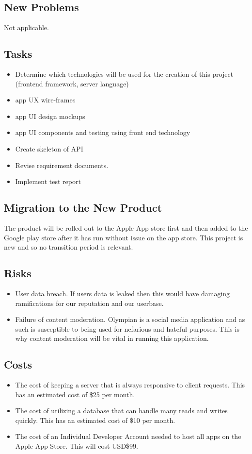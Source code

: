 \documentclass[12pt]{article}
\begin{document}
		\subsection{New Problems}
			Not applicable.
		\subsection{Tasks}
			\begin{itemize}
			\item Determine which technologies will be used for the creation of this project (frontend framework, server language)
			\item  app UX wire-frames
			\item  app UI design mockups
			\item  app UI components and testing using front end technology
			\item  Create skeleton of API
			\item  Revise requirement documents.
			\item  Implement test report
			\end{itemize}
		\subsection{Migration to the New Product}
			The product will be rolled out to the Apple App store first and then added to the Google play store after it has run without issue on the app store.
			This project is new and so no transition period is relevant.
		\subsection{Risks}
			\begin{itemize}
			\item User data breach. If users data is leaked then this would have damaging ramifications for our reputation and our userbase.
			\item Failure of content moderation. Olympian is a social media application and as such is susceptible to being used for nefarious and hateful purposes. This is why content moderation will be vital in running this application.
			\end{itemize}
		\subsection{Costs}
			\begin{itemize}
			\item The cost of keeping a server that is always responsive to client requests. This has an estimated cost of \$25 per month.
			\item The cost of utilizing a database that can handle many reads and writes quickly. This has an estimated cost of \$10 per month.
			\item The cost of an Individual Developer Account needed to host all apps on the Apple App Store. This will cost USD\$99.
			\end{itemize}
\end{document}
